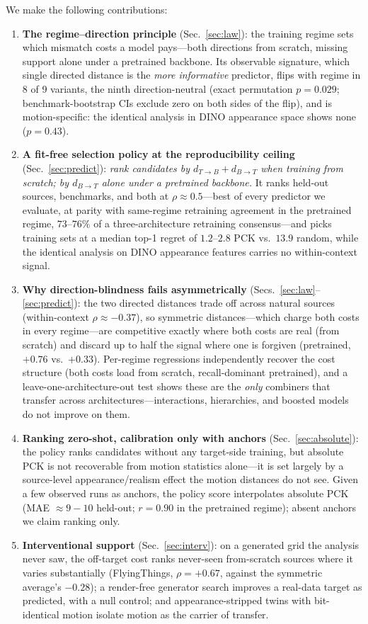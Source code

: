\documentclass[runningheads]{llncs}
\newcommand{\dtb}{d_{T\to B}}
\newcommand{\dbt}{d_{B\to T}}
\newcommand{\pck}{PCK}
\begin{document}
We make the following contributions:
\begin{enumerate}
\item \textbf{The regime--direction principle} (Sec.~\ref{sec:law}): the
  training regime sets which mismatch costs a model pays---both directions
  from scratch, missing support alone under a pretrained backbone. Its
  observable signature, which single directed distance is the \emph{more
  informative} predictor, flips with regime in 8 of 9 variants, the ninth
  direction-neutral (exact permutation $p{=}0.029$; benchmark-bootstrap CIs
  exclude zero on both sides of the flip), and is motion-specific: the
  identical analysis in DINO appearance space shows none ($p{=}0.43$).
\item \textbf{A fit-free selection policy at the reproducibility ceiling}
  (Sec.~\ref{sec:predict}): \emph{rank candidates by $\dtb{+}\dbt$ when
  training from scratch; by $\dbt$ alone under a pretrained backbone.} It
  ranks held-out sources, benchmarks, and both at $\rho \approx 0.5$---best
  of every predictor we evaluate, at parity with same-regime retraining
  agreement in the pretrained regime, $73$--$76\%$ of a three-architecture
  retraining consensus---and picks training sets at a median top-1 regret of
  $1.2$--$2.8$ \pck{} vs.\ $13.9$ random, while the identical analysis on
  DINO appearance features carries no within-context signal.
\item \textbf{Why direction-blindness fails asymmetrically}
  (Secs.~\ref{sec:law}--\ref{sec:predict}): the two directed distances
  trade off across natural sources (within-context $\rho \approx -0.37$),
  so symmetric distances---which charge both costs in every regime---are
  competitive exactly where both costs are real (from scratch) and discard
  up to half the signal where one is forgiven (pretrained,
  ${+}0.76$ vs.\ ${+}0.33$). Per-regime regressions independently recover
  the cost structure (both costs load from scratch, recall-dominant
  pretrained), and a leave-one-architecture-out test shows these are the \emph{only}
  combiners that transfer across architectures---interactions, hierarchies,
  and boosted models do not improve on them.
\item \textbf{Ranking zero-shot, calibration only with anchors}
  (Sec.~\ref{sec:absolute}): the policy ranks candidates without any target-side
  training, but absolute \pck{} is not recoverable from motion statistics
  alone---it is set largely by a source-level appearance/realism effect the
  motion distances do not see. Given a few observed runs as anchors, the policy
  score interpolates absolute \pck{} (MAE ${\approx}9{-}10$ held-out;
  $r{=}0.90$ in the pretrained regime); absent anchors we claim ranking only.
\item \textbf{Interventional support} (Sec.~\ref{sec:interv}): on a
  generated grid the analysis never saw, the off-target cost ranks
  never-seen from-scratch sources where it varies substantially
  (FlyingThings, $\rho{=}{+}0.67$, against the symmetric average's $-0.28$);
  a render-free generator search improves a real-data target as predicted,
  with a null control; and appearance-stripped twins with bit-identical
  motion isolate motion as the carrier of transfer.
\end{enumerate}
\end{document}
